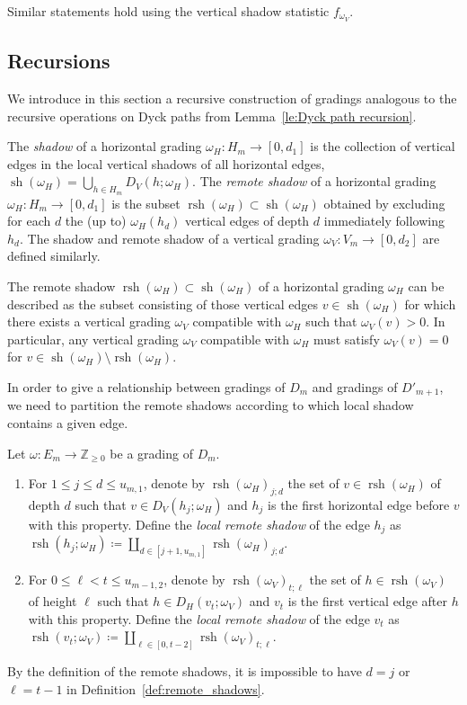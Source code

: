 \documentclass[ALCO,ThmDefs,Unicode,epreuves]{cedram}
\newcommand{\ZZ}{\mathbb{Z}}
\DeclareMathOperator{\rsh}{rsh}
\DeclareMathOperator{\sh}{sh}
\begin{document}
Similar statements hold using the vertical shadow statistic $f_{\omega_V}$.

\subsection{Recursions}
\label{sec:recursions}
We introduce in this section a recursive construction of gradings analogous to the recursive operations on Dyck paths from Lemma~\ref{le:Dyck path recursion}. 

The \emph{shadow} of a horizontal grading $\omega_H:H_m\to[0,d_1]$ is the collection of vertical edges in the local vertical shadows of all horizontal edges, \ie $\sh(\omega_H)=\bigcup_{h\in H_m} D_V(h;\omega_H)$. 
The \emph{remote shadow} of a horizontal grading $\omega_H:H_m\to[0,d_1]$ is the subset $\rsh(\omega_H)\subset\sh(\omega_H)$ obtained by excluding for each $d$ the (up to) $\omega_H(h_d)$ vertical edges of depth $d$ immediately following $h_d$. 
The shadow and remote shadow of a vertical grading $\omega_V:V_m\to[0,d_2]$ are defined similarly.
\begin{remark}
 \label{rem:remote shadows}
 The remote shadow $\rsh(\omega_H)\subset\sh(\omega_H)$ of a horizontal grading $\omega_H$ can be described as the subset consisting of those vertical edges $v\in\sh(\omega_H)$ for which there exists a vertical grading $\omega_V$ compatible with $\omega_H$ such that $\omega_V(v)>0$.
 In particular, any vertical grading $\omega_V$ compatible with $\omega_H$ must satisfy $\omega_V(v)=0$ for $v\in\sh(\omega_H)\setminus\rsh(\omega_H)$.
\end{remark}

In order to give a relationship between gradings of $D_m$ and gradings of $D'_{m+1}$, we need to partition the remote shadows according to which local shadow contains a given edge. 
\begin{definition}
 \label{def:remote_shadows}
 Let $\omega:E_m\to\ZZ_{\ge0}$ be a grading of $D_m$.
 \begin{enumerate}[label=(\alph*)]
 \item For $1\le j\le d\le u_{m,1}$, denote by $\rsh(\omega_H)_{j;d}$ the set of $v\in\rsh(\omega_H)$ of depth $d$ such that $v\in D_V(h_j;\omega_H)$ and $h_j$ is the first horizontal edge before $v$ with this property. 
 Define the \emph{local remote shadow} of the edge $h_j$ as $\rsh(h_j;\omega_H)\coloneqq \coprod\limits_{d\in[j+1,u_{m,1}]}\rsh(\omega_H)_{j;d}$.
 \item For $0\le\ell<t\le u_{m-1,2}$, denote by $\rsh(\omega_V)_{t;\ell}$ the set of $h\in\rsh(\omega_V)$ of height $\ell$ such that $h\in D_H(v_t;\omega_V)$ and $v_t$ is the first vertical edge after $h$ with this property. 
 Define the \emph{local remote shadow} of the edge $v_t$ as $\rsh(v_t;\omega_V)\coloneqq \coprod\limits_{\ell\in[0,t-2]}\rsh(\omega_V)_{t;\ell}$.
 \end{enumerate}
\end{definition}
\begin{remark}
 By the definition of the remote shadows, it is impossible to have $d=j$ or $\ell=t-1$ in Definition~\ref{def:remote_shadows}.
\end{remark}
\end{document}
